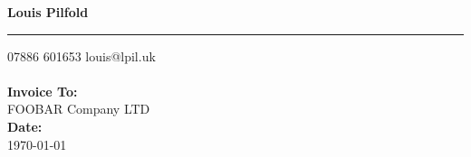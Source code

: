 \documentclass{invoice} %
\def \tab {\hspace*{3ex}} %
\begin{document}

\hfil{\Huge\bf Louis Pilfold}\hfil %
\bigskip\break %
\hrule %

07886 601653 \hfill louis@lpil.uk
\\ \\
{\bf Invoice To:} \\
\tab FOOBAR Company LTD \\ %

{\bf Date:} \\
\tab \today \\ %


\begin{invoiceTable}










\end{invoiceTable}

\end{document}
